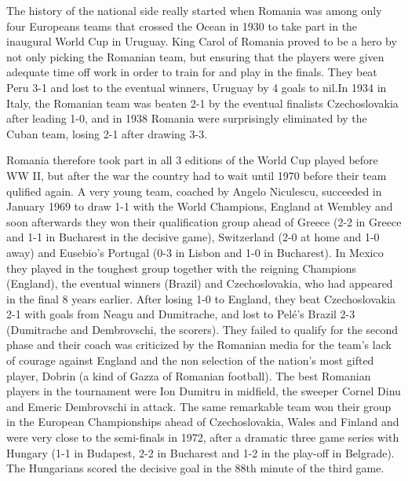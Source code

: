 The history of the national side really started when Romania was among only 
four Europeans teams that crossed the Ocean in 1930 to take part in the 
inaugural World Cup in Uruguay. King Carol of Romania proved to be a hero by
not only picking the Romanian team, but ensuring that the players were given 
adequate time off work in order to train for and play in the finals. They beat
Peru 3-1 and lost to the eventual winners, Uruguay by 4 goals to nil.In 1934 
in Italy, the Romanian team was beaten 2-1 by the eventual finalists 
Czechoslovakia after leading 1-0, and in 1938 Romania were surprisingly 
eliminated by the Cuban team, losing 2-1 after drawing 3-3.

Romania therefore took part in all 3 editions of the World Cup played before 
WW II, but after the war the country had to wait until 1970 before their team
qulified again. A very young team, coached  by  Angelo  Niculescu, succeeded in
January 1969 to draw 1-1 with the World Champions, England at Wembley and soon 
afterwards they won their qualification group ahead of Greece (2-2 in Greece 
and 1-1 in Bucharest in the decisive game), Switzerland (2-0 at home and 1-0
away) and Eusebio's Portugal (0-3 in Lisbon and 1-0 in Bucharest). In Mexico 
they played in the toughest group together with the reigning Champions 
(England), the eventual winners (Brazil) and Czechoslovakia, who had appeared
in the final 8 years earlier. After losing 1-0 to England, they beat 
Czechoslovakia 2-1 with goals from Neagu and Dumitrache, and lost to Pel{\'e}'s 
Brazil 2-3 (Dumitrache and Dembrovschi, the scorers). They failed to qualify 
for the second phase and their coach was criticized by the Romanian media for
the team's lack of courage against England and the non selection of the 
nation's most gifted player, Dobrin (a kind of Gazza of Romanian football).
The best Romanian players in the tournament were Ion Dumitru in midfield, the
sweeper Cornel Dinu and Emeric Dembrovschi in attack. The same remarkable team
won their group in the European Championships ahead of Czechoslovakia, Wales 
and Finland and were very close to the semi-finals in 1972, after a dramatic
three game series with Hungary (1-1 in Budapest, 2-2 in Bucharest and 1-2 in
the play-off in Belgrade). The  Hungarians scored the decisive goal in the 88th
minute of the third game.

